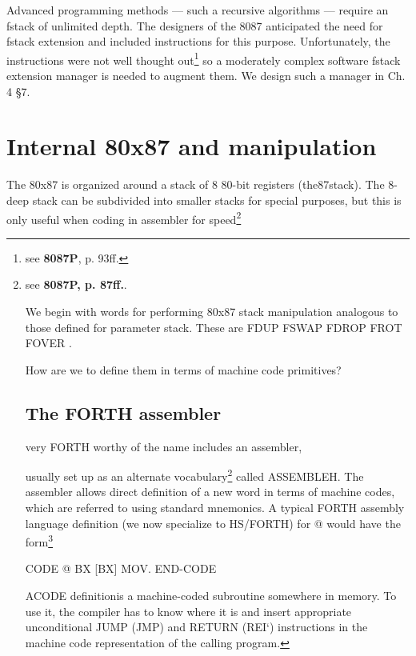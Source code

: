{Advanced programming methods — such a recursive algorithms — require an fstack of unlimited depth. The designers of the 8087 anticipated the need for fstack extension and included instructions for this purpose. Unfortunately, the instructions were not well thought out\footnote{see \textbf{8087P}, p. 93ff.} so a moderately complex software fstack extension manager is needed to augment them. We design such a manager in Ch. 4 §7.

\section{Internal 80x87 and manipulation}

The 80x87 is organized around a stack of 8 80-bit registers (the87stack). The 8-deep stack can be subdivided into smaller stacks for special purposes, but this is only useful when coding in assembler for speed\footnote{see \textbf{8087P, p. 87ff.}.

We begin with words for performing 80x87 stack manipulation analogous to those defined for parameter stack. These are FDUP FSWAP FDROP FROT FOVER .

How are we to define them in terms of machine code primitives?

\subsection{The FORTH assembler}

very FORTH worthy of the name includes an assembler,

usually set up as an alternate vocabulary\footnote{Vocabularies are a method for subdividing the dictionary.} called ASSEMBLEH.
The assembler allows direct definition of a new word in terms of
machine codes, which are referred to using standard mnemonics. A
typical FORTH assembly language definition (we now specialize to
HS/FORTH) for @ would have the form\footnote{BX is a CPU register, and \[BX\] means "the memory location wose address is in BX". HS/FORTH uses a naming convention in which assembler mnemonics end with a period, \textit{e.g.} MOV, . Also, HS/FORTH makes the TOS the BX register, to reduce the number of pushes and pops needed to execute simple words.}

CODE @ BX [BX] MOV. END-CODE

ACODE definitionis a machine-coded subroutine somewhere
in memory. To use it, the compiler has to know where it is and
insert appropriate unconditional JUMP (JMP) and RETURN
(REI‘) instructions in the machine code representation of the
calling program.

}}
